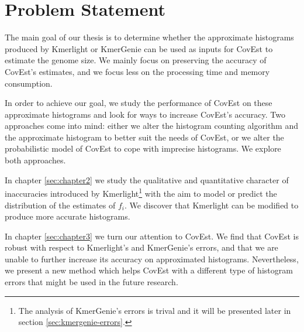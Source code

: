 \section{Problem Statement}
The main goal of our thesis is to determine whether the approximate histograms
produced by Kmerlight or KmerGenie can be used as inputs for CovEst to
estimate the genome size. We mainly focus on preserving the 
accuracy of CovEst's estimates, and we focus less on the processing time and memory consumption. 

In order to achieve our goal, we study the performance of CovEst on these approximate
histograms and look for ways to increase CovEst's accuracy. Two approaches
come into mind: either we alter the histogram counting algorithm and the approximate
histogram to better suit the needs of CovEst, or we alter the probabilistic model of CovEst to
cope with imprecise histograms. We explore both approaches. 

In chapter \ref{sec:chapter2} we study the qualitative and quantitative character
of inaccuracies introduced by Kmerlight\footnote{The analysis of KmerGenie's errors is trival
and it will be presented later in section \ref{sec:kmergenie-errors}.} with the aim to model or
predict the distribution of the estimates of $f_i$. We discover that Kmerlight can be modified
to produce more accurate histograms.

In chapter \ref{sec:chapter3} we turn our attention to CovEst. We find that CovEst is robust
with respect to Kmerlight's and KmerGenie's errors, and that we are unable to further increase
its accuracy on approximated histograms. Nevertheless, we present a new method which helps CovEst
with a different type of histogram errors that might be used in the future research.
